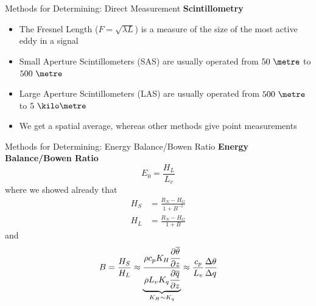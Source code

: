 
\begin{frame}{Methods for Determining: Direct Measurement}
\textbf{Scintillometry}
\begin{itemize}
	\item The Fresnel Length ($F=\sqrt{\lambda L}$) is a measure of the size of the most active eddy in a signal
	\item Small Aperture Scintillometers (SAS) are usually operated from $50\ \metre$ to $500\ \metre$
	\item Large Aperture Scintillometers (LAS) are usually operated from $500\ \metre$ to $5\ \kilo\metre$
	\item We get a spatial average, whereas other methods give point measurements
\end{itemize}
\end{frame}

\begin{frame}{Methods for Determining: Energy Balance/Bowen Ratio}
\textbf{Energy Balance/Bowen Ratio}
$$E_0 = \frac{H_L}{L_v}$$
where we showed already that
\begin{align*}
H_S &= \frac{R_N - H_G}{1+B^{-1}}\\
H_L &= \frac{R_N - H_G}{1+B}
\end{align*}
and
$$B=\frac{H_S}{H_L} \approx \underbrace{\frac{\rho c_p K_H\cfrac{\partial \overline{\theta}}{\partial z}}{\rho L_v K_q \cfrac{\partial \overline{q}}{\partial z}}}_{K_H \sim K_q} \approx \frac{c_p}{L_v}\frac{\Delta \theta}{\Delta q}$$
\end{frame}


